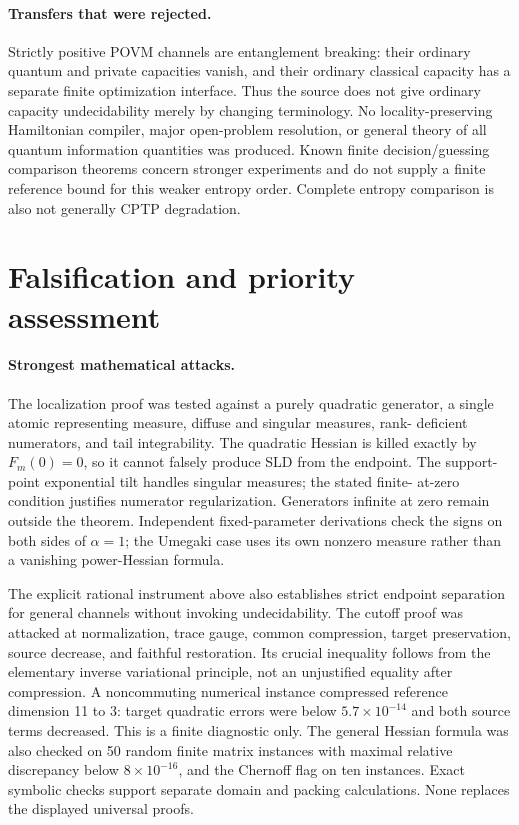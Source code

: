 \documentclass[11pt]{article}
\begin{document}
\paragraph{Transfers that were rejected.}
Strictly positive POVM channels are entanglement breaking: their ordinary
quantum and private capacities vanish, and their ordinary classical capacity
has a separate finite optimization interface. Thus the source does not give
ordinary capacity undecidability merely by changing terminology. No
locality-preserving Hamiltonian compiler, major open-problem resolution, or
general theory of all quantum information quantities was produced. Known
finite decision/guessing comparison theorems concern stronger experiments and
do not supply a finite reference bound for this weaker entropy order. Complete
entropy comparison is also not generally CPTP degradation.

\section{Falsification and priority assessment}
\paragraph{Strongest mathematical attacks.}
The localization proof was tested against a purely quadratic generator, a
single atomic representing measure, diffuse and singular measures, rank-
deficient numerators, and tail integrability. The quadratic Hessian is killed
exactly by $F_m(0)=0$, so it cannot falsely produce SLD from the endpoint. The
support-point exponential tilt handles singular measures; the stated finite-
at-zero condition justifies numerator regularization. Generators infinite at
zero remain outside the theorem. Independent fixed-parameter derivations
check the signs on both sides of $\alpha=1$; the Umegaki case uses its own
nonzero measure rather than a vanishing power-Hessian formula.

The explicit rational instrument above also establishes strict endpoint
separation for general channels without invoking undecidability.
The cutoff proof was attacked at normalization, trace gauge, common compression,
target preservation, source decrease, and faithful restoration. Its crucial
inequality follows from the elementary inverse variational principle, not an
unjustified equality after compression. A noncommuting numerical instance
compressed reference dimension 11 to 3: target quadratic errors were below
$5.7\times10^{-14}$ and both source terms decreased. This is a finite diagnostic
only. The general Hessian formula was also checked on 50 random finite matrix
instances with maximal relative discrepancy below $8\times10^{-16}$, and the
Chernoff flag on ten instances. Exact symbolic checks support separate domain
and packing calculations. None replaces the displayed universal proofs.
\end{document}
